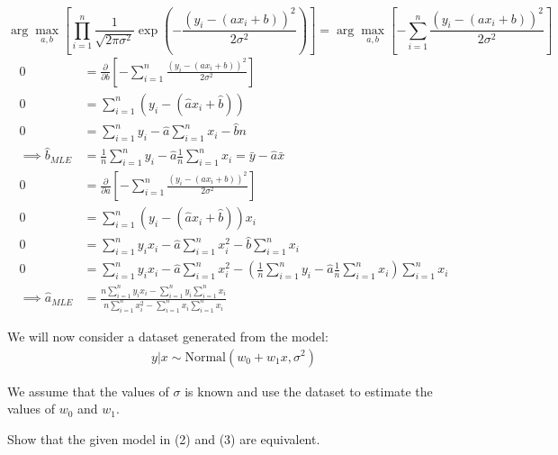 \documentclass{article}
\begin{document}
\begin{probset}
\begin{prob}
\begin{subprobset}
\begin{subprob}
        \begin{soln}
            \[ 
                \arg\max_{a, b} \left[ \prod_{i=1}^n \frac{1}{\sqrt{2\pi\sigma^2}} \exp\left(-\frac{(y_i - (a x_i + b))^2}{2\sigma^2}\right) \right] = \arg\max_{a, b} \left[ -\sum_{i=1}^n \frac{(y_i - (a x_i + b))^2}{2\sigma^2} \right] 
            \]
            \begin{align*}
                0 &= \frac{\partial}{\partial b} \left[ -\sum_{i=1}^n \frac{(y_i - (a x_i + b))^2}{2\sigma^2} \right] \\
                0 &= \sum_{i=1}^n (y_i - (\hat{a} x_i + \hat{b})) \\
                0 &= \sum_{i=1}^n y_i - \hat{a} \sum_{i=1}^n x_i - \hat{b}n \\
                \implies \hat{b}_{MLE} &= \frac{1}{n} \sum_{i=1}^n y_i - \hat{a}  \frac{1}{n} \sum_{i=1}^n x_i = \bar{y} - \hat{a} \bar{x} \\
                0 &= \frac{\partial}{\partial a} \left[ -\sum_{i=1}^n \frac{(y_i - (a x_i + b))^2}{2\sigma^2} \right] \\
                0 &= \sum_{i=1}^n (y_i - (\hat{a} x_i + \hat{b})) x_i \\
                0 &= \sum_{i=1}^n y_i x_i - \hat{a} \sum_{i=1}^n x_i^2 - \hat{b} \sum_{i=1}^n x_i \\
                0 &= \sum_{i=1}^n y_i x_i - \hat{a} \sum_{i=1}^n x_i^2 - \left( \frac{1}{n} \sum_{i=1}^n y_i - \hat{a} \frac{1}{n} \sum_{i=1}^n x_i \right) \sum_{i=1}^n x_i \\
                \implies \hat{a}_{MLE} &= \frac{n \displaystyle\sum_{i=1}^n y_i x_i - \displaystyle\sum_{i=1}^n y_i \displaystyle\sum_{i=1}^n x_i}{n \displaystyle\sum_{i=1}^n x_i^2 - \displaystyle\sum_{i=1}^n x_i \displaystyle\sum_{i=1}^n x_i}
            \end{align*}
        \end{soln}
    \end{subprob}

    \newpage

    We will now consider a dataset generated from the model:
    \begin{align}
        y | x \sim \text{Normal}(w_0 + w_1 x, \sigma^2)
    \end{align}

    We assume that the values of $\sigma$ is known and use the dataset to estimate the values of $w_0$ and $w_1$.

    \begin{subprob}
        Show that the given model in (2) and (3) are equivalent.


\end{subprob}
\end{subprobset}
\end{prob}
\end{probset}
\end{document}

